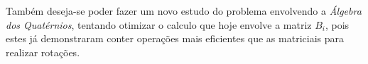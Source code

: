 \documentclass[a4paper,12pt]{article}
\begin{document}
	Também deseja-se poder fazer um novo estudo do problema envolvendo a \textit{Álgebra dos Quatérnios}, tentando otimizar o calculo que hoje envolve a matriz $B_i$, pois estes já demonstraram conter operações mais eficientes que as matriciais para realizar rotações.
	
	\newpage
	
	
	
	
	\newpage
	\appendix
	
\end{document}
